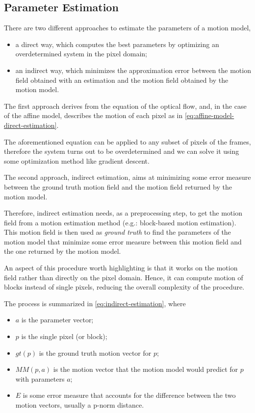 \subsection{Parameter Estimation}
There are two different approaches to estimate the parameters of a motion model,
\begin{itemize}
    \item a direct way, which computes the best parameters by optimizing an overdetermined system in the pixel domain;
    \item an indirect way, which minimizes the approximation error between the motion field obtained with an estimation and the motion field obtained by the motion model.
\end{itemize}

The first approach derives from the equation of the optical flow, and, in the case of the affine model, describes the motion of each pixel as in \cref{eq:affine-model-direct-estimation}. 

The aforementioned equation can be applied to any subset of pixels of the frames, therefore the system turns out to be overdetermined and we can solve it using some optimization method like gradient descent.

The second approach, indirect estimation, aims at minimizing some error measure between the ground truth motion field and the motion field returned by the motion model.

Therefore, indirect estimation needs, as a preprocessing step, to get the motion field from a motion estimation method (e.g.: block-based motion estimation). This motion field is then used as \textit{ground truth} to find the parameters of the motion model that minimize some error measure between this motion field and the one returned by the motion model.

An aspect of this procedure worth highlighting is that it works on the motion field rather than directly on the pixel domain. Hence, it can compute motion of blocks instead of single pixels, reducing the overall complexity of the procedure.

The process is summarized in \cref{eq:indirect-estimation}, where
\begin{itemize}
    \item $a$ is the parameter vector;
    \item $p$ is the single pixel (or block);
    \item $gt(p)$ is the ground truth motion vector for $p$;
    \item $MM(p,a)$ is the motion vector that the motion model would predict for $p$ with parameters $a$;
    \item $E$ is some error measure that accounts for the difference between the two motion vectors, usually a p-norm distance.
\end{itemize}

